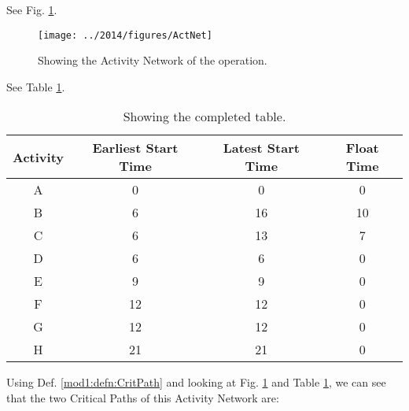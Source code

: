 %
%

\begin{subquestions}


\subquestion
\begin{subsubquestions}
	
\subsubquestion
See Fig. \ref{2014:q2:fig:ActNet}.

\begin{figure}
	\begin{center}
		\texttt{[image: ../2014/figures/ActNet]}
		\caption{\label{2014:q2:fig:ActNet} Showing the Activity Network of the operation.}
	\end{center}
\end{figure}

\subsubquestion

 See Table \ref{2014:tab:Act}. 
\begin{table}[ht]
	\centering
	\begin{tabular}{|c|c|c|c|}
		\hline
		Activity&Earliest Start Time&Latest Start Time&Float Time\\
		\hline
		A&0&0&0 \\
		B&6&16&10 \\
		C&6&13&7 \\
		D&6&6&0 \\
		E&9&9&0 \\
		F&12&12&0 \\
		G&12&12&0 \\
		H&21&21&0 \\
		\hline
		
	\end{tabular}
\caption{\label{2014:tab:Act} Showing the completed table.}
\end{table}

\subsubquestion

Using Def. \ref{mod1:defn:CritPath} and looking at Fig. \ref{2014:q2:fig:ActNet} and Table \ref{2014:tab:Act}, we can see that the two Critical Paths of this Activity Network are:


\end{subsubquestions}
\end{subquestions}
